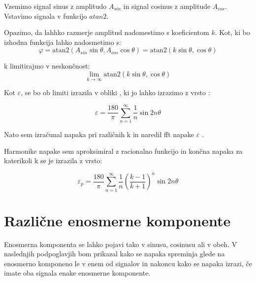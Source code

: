 Vzemimo signal sinus z amplitudo $A_{sin}$ in signal cosinus z amplitude $A_{cos}$. Vstavimo signala v funkcijo $atan2$.

Opazimo, da lahhko razmerje amplitud nadomestimo s koeficientom $k$. Kot, ki bo izhodna funkcija lahko nadosmetimo s:
\begin{equation}
\varphi =  \mathrm{atan2}(A_{sin} \sin{\theta}, A_{cos} \cos{\theta}) = \mathrm{atan2}(k \sin{\theta},\cos{\theta})
\end{equation}

k limitirajmo v neskončnost:
\begin{equation}
\lim_{k \rightarrow \infty} \mathrm{atan2}(k \sin{\theta},\cos{\theta})
\end{equation}


Kot $\varepsilon$, se bo ob limiti  izrazila v obliki , ki jo lahko izrazimo z vrsto \cite{fourierova_vrsta}:

\begin{equation}
\varepsilon = \frac{180}{\pi}\sum_{n=1}^{\infty}\frac{1}{n} \sin 2 n \theta
\end{equation}

Nato sem izračunal napaka pri različnih k in naredil fft napake $\varepsilon$ \cite{matlab_fft}.

Harmonike napake sem aproksimiral z racionalno funkcijo in končna napaka za katerikoli k se je izrazila z vrsto:

\begin{equation}
\label{vrsta_k}
\varepsilon_p =\frac{180}{\pi}\sum_{n=1}^{\infty}\frac{1}{n}(\frac{k-1}{k+1})^n \sin 2 n \theta
\end{equation}

\newpage
\section{Različne enosmerne komponente}

Enosmerna komponenta se lahko pojavi tako v sinusu, cosinusu ali v obeh. V naslednjih podpoglavjih bom prikazal kako se napaka spreminja glede na enosmerno komponeno le v enem od signalov in nakoncu kako se napaka izrazi, če imate oba signala enake enosmerne komponente.

